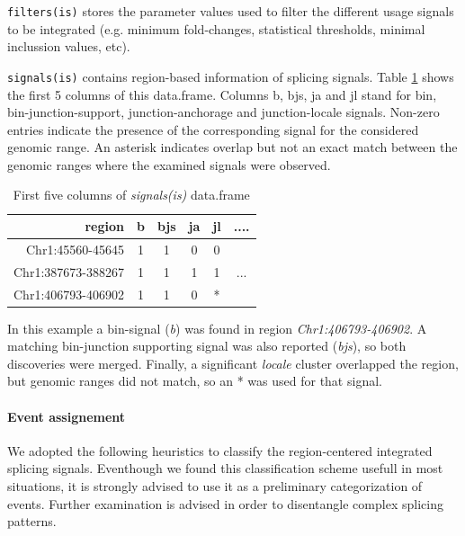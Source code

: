 \documentclass{article}
\begin{document}
\texttt{filters(is)} stores the parameter values used to filter the different usage signals to be integrated (e.g. minimum fold-changes, statistical thresholds, minimal inclussion values, etc).  


\texttt{signals(is)} contains region-based information of splicing signals. Table \ref{tab:iiss} shows the first 5 columns of this data.frame. Columns b, bjs, ja and jl stand for bin, bin-junction-support, junction-anchorage and junction-locale signals. Non-zero entries indicate the presence of the corresponding signal for the considered genomic range.  An asterisk indicates overlap but not an exact match between the genomic ranges where the examined signals were observed.


\begin{table}[H]
  \begin{center}
    \begin{tabular}{rccccc}
              region & b & bjs & ja & jl & ....\\ \hline
 Chr1:45560-45645   & 1 & 1 & 0  & 0 &\\
 Chr1:387673-388267 & 1 & 1 & 1  & 1 & ...\\
 Chr1:406793-406902 & 1 & 1 & 0  & * &\\  
    \end{tabular}
  \end{center}
  \caption{First five columns of {\em signals(is)} data.frame}
  \label{tab:iiss}
\end{table}

In this example a bin-signal ({\em b}) was found in region {\em Chr1:406793-406902}. A matching bin-junction supporting signal was also reported ({\em bjs}), so both discoveries were merged. Finally, a significant {\em locale} cluster overlapped the region, but genomic ranges did not match, so an * was used for that signal.

\paragraph{Event assignement} We adopted the following heuristics to classify the region-centered integrated splicing signals. Eventhough we found this classification scheme usefull in most situations, it is strongly advised to use it as a preliminary categorization of events. Further examination is advised in order to disentangle complex splicing patterns. 
\end{document}
